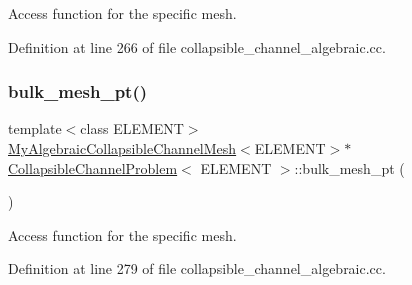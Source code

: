 Access function for the specific mesh. 



Definition at line 266 of file collapsible\+\_\+channel\+\_\+algebraic.\+cc.

\mbox{\label{classCollapsibleChannelProblem_a411441ab7ac76c04613b1a7f558a6621}} 
\subsubsection{\texorpdfstring{bulk\+\_\+mesh\+\_\+pt()}{bulk\_mesh\_pt()}\hspace{0.1cm}{\footnotesize\ttfamily [3/3]}}
{\footnotesize\ttfamily template$<$class E\+L\+E\+M\+E\+NT$>$ \\
\hyperlink{classoomph_1_1MyAlgebraicCollapsibleChannelMesh}{My\+Algebraic\+Collapsible\+Channel\+Mesh}$<$E\+L\+E\+M\+E\+NT$>$$\ast$ \hyperlink{classCollapsibleChannelProblem}{Collapsible\+Channel\+Problem}$<$ E\+L\+E\+M\+E\+NT $>$\+::bulk\+\_\+mesh\+\_\+pt (\begin{DoxyParamCaption}{ }\end{DoxyParamCaption})\hspace{0.3cm}{\ttfamily [inline]}}



Access function for the specific mesh. 



Definition at line 279 of file collapsible\+\_\+channel\+\_\+algebraic.\+cc.

\mbox{\label{classCollapsibleChannelProblem_a70cfe97c12c0cb6a2a81266cdd4d6088}} 
